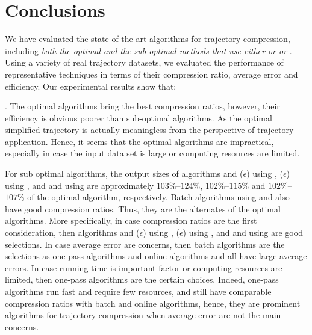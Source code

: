 \vspace{-1ex}
\section{Conclusions}

We have evaluated the state-of-the-art \lsa algorithms for trajectory compression, including \emph{both the optimal and the sub-optimal methods that use either \ped or \sed or \dad}.
Using a variety of real trajectory datasets, we evaluated the performance of representative techniques in terms of their compression ratio, average error and efficiency.
Our experimental results show that:


\emph{}. The optimal algorithms bring the best compression ratios, however, their efficiency is obvious poorer than sub-optimal algorithms. As the optimal simplified trajectory is actually meaningless from the perspective of trajectory application. Hence, it seems that the optimal algorithms are impractical, especially in case the input data set is large or computing resources are limited.

For sub optimal algorithms, the output sizes of algorithms \bqsa and \siped($\epsilon$) using \ped, \cised($\epsilon$) using \sed, and \tpa and \interval using \dad are approximately $103\%$--$124\%$, $102\%$--$115\%$ and $102\%$--$107\%$ of the optimal algorithm, respectively. Batch algorithms using \ped and \sed also have good compression ratios. Thus, they are the alternates of the optimal algorithms.
%
More specifically, in case compression ratios are the first consideration, then algorithms \bqsa and \siped($\epsilon$) using \ped, \cised($\epsilon$) using \sed, and \tpa and \interval using \dad are good selections.
%
In case average error are concerns, then batch algorithms are the selections as one pass algorithms and online algorithms \opwa and \bqsa all have large average errors. %
%
In case running time is important factor or computing resources are limited, then one-pass algorithms are the certain choices.
%
Indeed, one-pass algorithms run fast and require few resources, and still have comparable compression ratios with batch and online algorithms, hence, they are prominent algorithms for trajectory compression when average error are not the main concerns.

